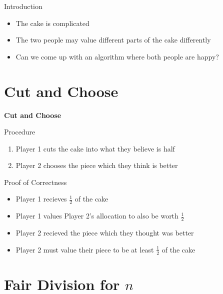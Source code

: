 \documentclass[aspectratio=169,xcolor=dvipsnames]{beamer}
\begin{document}
\begin{frame}{Introduction}
    \begin{itemize}
        \item The cake is complicated
        \item The two people may value different parts of the cake differently\pause
        \item Can we come up with an algorithm where both people are happy?
    \end{itemize}
\end{frame}
\section{Cut and Choose}
\begin{frame}
	\Huge{\centerline{\textbf{Cut and Choose}}}
\end{frame}
\begin{frame}{Procedure}
	\begin{enumerate}
		\item Player 1 cuts the cake into what they believe is half
		\item Player 2 chooses the piece which they think is better
	\end{enumerate}
\end{frame}
\begin{frame}{Proof of Correctness}
	\begin{itemize}
		\item Player 1 recieves $\frac{1}{2}$ of the cake
		\item Player 1 values Player 2's allocation to also be worth $\frac{1}{2}$\pause
		\item Player 2 recieved the piece which they thought was better
		\item Player 2 must value their piece to be at least $\frac{1}{2}$ of the cake
	\end{itemize}
\end{frame}
\section{Fair Division for $n$}
\end{document}
